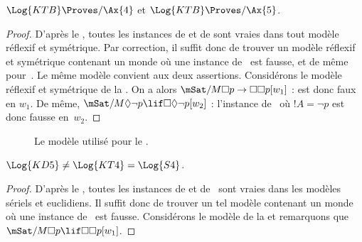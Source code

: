 \documentclass[../../../include/open-logic-section]{subfiles}
\begin{document}
\begin{thm}
  $\Log{KTB} \Proves/ \Ax{4}$ et $\Log{KTB} \Proves/ \Ax{5}$.
\end{thm}

\begin{proof}
  D'après le , toutes les instances de
   et de  sont vraies dans tout modèle réflexif et
  symétrique. Par correction, il suffit donc de trouver un modèle
  réflexif et symétrique contenant un monde où une instance de~
  est fausse, et de même pour~. Le même modèle convient aux deux
  assertions. Considérons le modèle réflexif et symétrique de la
  . On a alors $\mSat/{M}{\Box p \to \Box \Box
    p}[w_1]$ :  est donc faux en $w_1$. De même,
  $\mSat/{M}{\Diamond \lnot p \lif \Box \Diamond \lnot p}[w_2]$ :
  l'instance de~ où $!A = \lnot p$ est donc fausse en~$w_2$.
\end{proof}

\begin{figure}[htpb]
  \centering
  \caption{Le modèle utilisé pour le .}
\end{figure}

\begin{thm}
  $\Log{KD5} \neq \Log{KT4} = \Log{S4}$.
\end{thm}

\begin{proof}
  D'après le , toutes les instances de
   et de~ sont vraies dans les modèles sériels et
  euclidiens. Il suffit donc de trouver un tel modèle contenant un
  monde où une instance de~ est fausse. Considérons le modèle
  de la  et remarquons que
  $\mSat/{M}{\Box p \lif \Box\Box p}[w_1]$.
\end{proof}
\end{document}

